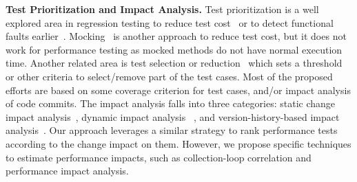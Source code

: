 \noindent\textbf{Test Prioritization and Impact Analysis.} Test prioritization is a well explored area in regression testing to reduce test cost~\cite{HARROLD93,BLACK04,ZHONG06} or to detect functional faults earlier~\cite{ELBAUM00,KIM02,LI07}. Mocking~\cite{MockStudy} is another approach to reduce test cost, but it does not work for performance testing as mocked methods do not have normal execution time. Another related area is test selection or reduction~\cite{ROTHERMEL97,CHEN94,Hao2009} which sets a threshold or other criteria to select/remove part of the test cases. Most of the proposed efforts are based on some coverage criterion for test cases, and/or impact analysis of code commits. The impact analysis falls into three categories: static change impact analysis~\cite{TURVERref,Arnoldref96,Wang2010ASE}, dynamic impact analysis
~\cite{LAW03,ORSO11,APIWATTANAPON05}, and version-history-based impact analysis~\cite{ZIMMERMANN04,SHERRIFF08,MengHima}. Our approach leverages a similar strategy to rank performance tests according to the change impact on them. However, we propose specific techniques to estimate performance impacts, such as collection-loop correlation and performance impact analysis. 


